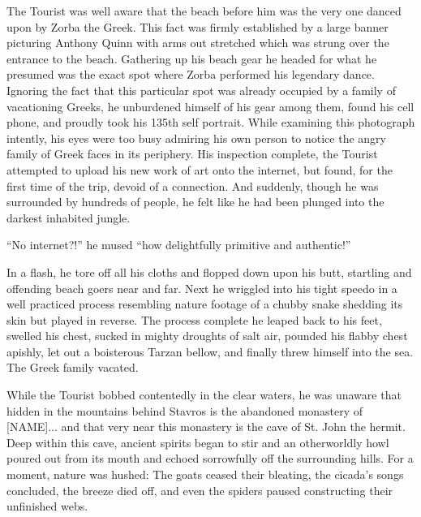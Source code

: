 \documentclass[10pt,twoside,openright]{memoir}
\begin{document}
The Tourist was well aware that the beach before him was the very one danced upon by Zorba the Greek. This fact was firmly established by a large banner picturing Anthony Quinn with arms out stretched which was strung over the entrance to the beach. Gathering up his beach gear he headed for what he presumed was the exact spot where Zorba performed his legendary dance. Ignoring the fact that this particular spot was already occupied by a family of vacationing Greeks, he unburdened himself of his gear among them, found his cell phone, and proudly took his 135th self portrait. While examining this photograph intently, his eyes were too busy admiring his own person to notice the angry family of Greek faces in its periphery. His inspection complete, the Tourist attempted to upload his new work of art onto the internet, but found, for the first time of the trip, devoid of a connection. And suddenly, though he was surrounded by hundreds of people, he felt like he had been plunged into the darkest inhabited jungle.

``No internet?!'' he mused ``how delightfully primitive and authentic!''

In a flash, he tore off all his cloths and flopped down upon his butt, startling and offending beach goers near and far. Next he wriggled into his tight speedo in a well practiced process resembling nature footage of a chubby snake shedding its skin but played in reverse. The process complete he leaped back to his feet, swelled his chest, sucked in mighty droughts of salt air, pounded his flabby chest apishly, let out a boisterous Tarzan bellow, and finally threw himself into the sea. The Greek family vacated.

While the Tourist bobbed contentedly in the clear waters, he was unaware that hidden in the mountains behind Stavros is the abandoned monastery of [NAME]... and that very near this monastery is the cave of St. John the hermit. Deep within this cave, ancient spirits began to stir and an otherworldly howl poured out from its mouth and echoed sorrowfully off the surrounding hills. For a moment, nature was hushed: The goats ceased their bleating, the cicada's songs concluded, the breeze died off, and even the spiders paused constructing their unfinished webs.
\end{document}
